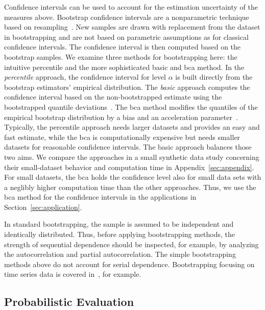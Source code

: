 Confidence intervals can be used to account for the estimation uncertainty of the measures above.
Bootstrap confidence intervals are a nonparametric technique based on resampling~\parencite[for introductions see][]{Hesterberg2011,Bittmann2021}.
New samples are drawn with replacement from the dataset in bootstrapping and are not based on parametric assumptions as for classical confidence intervals.
The confidence interval is then computed based on the bootstrap samples.
We examine three methods for bootstrapping here: the intuitive percentile and the more sophisticated basic and \ac{bca} method.
In the \textit{percentile} approach, the confidence interval for level $\alpha$ is built directly from the bootstrap estimators' empirical distribution.
The \textit{basic} approach computes the confidence interval based on the non-bootstrapped estimate using the bootstrapped quantile deviations~\parencite{Davison1997}.
The \ac{bca} method modifies the quantiles of the empirical bootstrap distribution by a bias and an acceleration parameter~\parencite{Efron1987}.
Typically, the percentile approach needs larger datasets and provides an easy and fast estimate, while the \ac{bca} is computationally expensive but needs smaller datasets for reasonable confidence intervals.
The basic approach balances those two aims.
We compare the approaches in a small synthetic data study concerning their small-dataset behavior and computation time in Appendix~\ref{sec:appendix}.
For small datasets, the \ac{bca} holds the confidence level also for small data sets with a neglibly higher computation time than the other approaches.
Thus, we use the \ac{bca} method for the confidence intervals in the applications in Section~\ref{sec:application}.

In standard bootstrapping, the sample is assumed to be independent and identically distributed.
Thus, before applying bootstrapping methods, the strength of sequential dependence should be inspected, for example, by analyzing the autocorrelation and partial autocorrelation.
The simple bootstrapping methods above do not account for serial dependence. 
Bootstrapping focusing on time series data is covered in~\textcite{Hardle2003,Kreiss2012}, for example.

\subsection{Probabilistic Evaluation}

